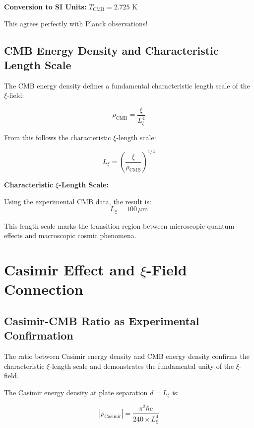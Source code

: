 \documentclass[12pt,a4paper]{article}
\newcommand{\xipar}{\xi}
\newcommand{\Lxi}{L_\xi}
\newcommand{\rhoCMB}{\rho_{\text{CMB}}}
\newcommand{\rhoCasimir}{\rho_{\text{Casimir}}}
\begin{document}
	\textbf{Conversion to SI Units:} $T_{\text{CMB}} = 2.725$ K
	
	This agrees perfectly with Planck observations!
	
	\subsection{CMB Energy Density and Characteristic Length Scale}
	
	The CMB energy density defines a fundamental characteristic length scale of the $\xi$-field:
	
	\begin{equation}
		\rhoCMB = \frac{\xipar}{\Lxi^4}
	\end{equation}
	
	From this follows the characteristic $\xi$-length scale:
	
	\begin{equation}
		\Lxi = \left(\frac{\xipar}{\rhoCMB}\right)^{1/4}
	\end{equation}
	
	\begin{keyresult}
		\textbf{Characteristic $\xi$-Length Scale:}
		
		Using the experimental CMB data, the result is:
		\begin{equation}
			\Lxi = 100 \, \mu\text{m}
		\end{equation}
		
		This length scale marks the transition region between microscopic quantum effects and macroscopic cosmic phenomena.
	\end{keyresult}
	
	\section{Casimir Effect and $\xi$-Field Connection}
	
	\subsection{Casimir-CMB Ratio as Experimental Confirmation}
	
	The ratio between Casimir energy density and CMB energy density confirms the characteristic $\xi$-length scale and demonstrates the fundamental unity of the $\xi$-field.
	
	The Casimir energy density at plate separation $d = \Lxi$ is:
	
	\begin{equation}
		|\rhoCasimir| = \frac{\pi^2 \hbar c}{240 \times \Lxi^4}
	\end{equation}
	
\end{document}
